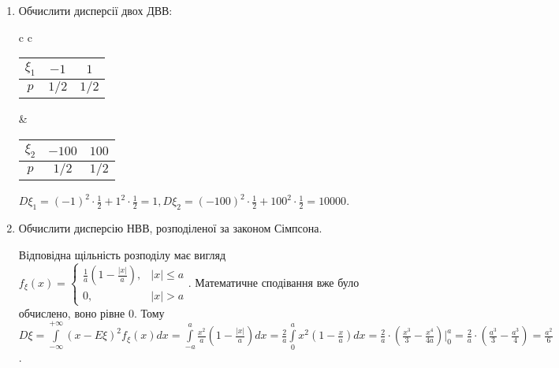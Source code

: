 \begin{example}
    \begin{enumerate}
        \item Обчислити дисперсії двох ДВВ:
        
        \begin{tabular}{c c}
            \begin{tabular}{|c|c|c|}
                \hline
                $\xi_1$ & $-1$ & $1$ \\ 
                \hline
                $p$ & $1/2$ & $1/2$ \\
                \hline
            \end{tabular} &
            \begin{tabular}{|c|c|c|}
                \hline
                $\xi_2$ & $-100$ & $100$ \\ 
                \hline
                $p$ & $1/2$ & $1/2$ \\
                \hline
            \end{tabular}
        \end{tabular}
        
        $D\xi_1 = (-1)^2\cdot \frac{1}{2} + 1^2\cdot \frac{1}{2} = 1, D\xi_2 = (-100)^2\cdot \frac{1}{2} + 100^2\cdot \frac{1}{2} = 10000$.
        \item Обчислити дисперсію НВВ, розподіленої за законом Сімпсона.
        
        Відповідна щільність розподілу має вигляд $f_\xi(x) = \begin{cases}
            \frac{1}{a} \left(1 - \frac{|x|}{a}\right), & |x| \leq a \\
            0, & |x| > a
        \end{cases}$.
        Математичне сподівання вже було обчислено, воно рівне 0. Тому $D\xi = \int\limits_{-\infty}^{+\infty} \left(x-E\xi\right)^2 f_\xi(x)dx =
        \int\limits_{-a}^a \frac{x^2}{a}\left(1 - \frac{|x|}{a}\right)dx = \frac{2}{a}\int\limits_0^a {x^2}\left(1 - \frac{x}{a}\right)dx =
        \frac{2}{a}\cdot \left( \frac{x^3}{3} - \frac{x^4}{4a}\right)\Bigr\vert_0^a = \frac{2}{a} \cdot \left( \frac{a^3}{3} - \frac{a^3}{4}\right) = \frac{a^2}{6}$.
    \end{enumerate}
\end{example}

